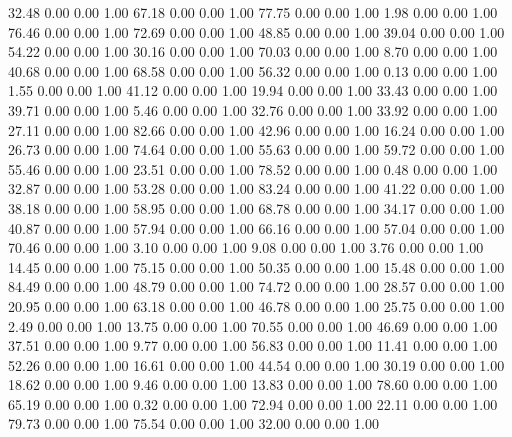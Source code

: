    32.48   0.00   0.00   1.00
   67.18   0.00   0.00   1.00
   77.75   0.00   0.00   1.00
    1.98   0.00   0.00   1.00
   76.46   0.00   0.00   1.00
   72.69   0.00   0.00   1.00
   48.85   0.00   0.00   1.00
   39.04   0.00   0.00   1.00
   54.22   0.00   0.00   1.00
   30.16   0.00   0.00   1.00
   70.03   0.00   0.00   1.00
    8.70   0.00   0.00   1.00
   40.68   0.00   0.00   1.00
   68.58   0.00   0.00   1.00
   56.32   0.00   0.00   1.00
    0.13   0.00   0.00   1.00
    1.55   0.00   0.00   1.00
   41.12   0.00   0.00   1.00
   19.94   0.00   0.00   1.00
   33.43   0.00   0.00   1.00
   39.71   0.00   0.00   1.00
    5.46   0.00   0.00   1.00
   32.76   0.00   0.00   1.00
   33.92   0.00   0.00   1.00
   27.11   0.00   0.00   1.00
   82.66   0.00   0.00   1.00
   42.96   0.00   0.00   1.00
   16.24   0.00   0.00   1.00
   26.73   0.00   0.00   1.00
   74.64   0.00   0.00   1.00
   55.63   0.00   0.00   1.00
   59.72   0.00   0.00   1.00
   55.46   0.00   0.00   1.00
   23.51   0.00   0.00   1.00
   78.52   0.00   0.00   1.00
    0.48   0.00   0.00   1.00
   32.87   0.00   0.00   1.00
   53.28   0.00   0.00   1.00
   83.24   0.00   0.00   1.00
   41.22   0.00   0.00   1.00
   38.18   0.00   0.00   1.00
   58.95   0.00   0.00   1.00
   68.78   0.00   0.00   1.00
   34.17   0.00   0.00   1.00
   40.87   0.00   0.00   1.00
   57.94   0.00   0.00   1.00
   66.16   0.00   0.00   1.00
   57.04   0.00   0.00   1.00
   70.46   0.00   0.00   1.00
    3.10   0.00   0.00   1.00
    9.08   0.00   0.00   1.00
    3.76   0.00   0.00   1.00
   14.45   0.00   0.00   1.00
   75.15   0.00   0.00   1.00
   50.35   0.00   0.00   1.00
   15.48   0.00   0.00   1.00
   84.49   0.00   0.00   1.00
   48.79   0.00   0.00   1.00
   74.72   0.00   0.00   1.00
   28.57   0.00   0.00   1.00
   20.95   0.00   0.00   1.00
   63.18   0.00   0.00   1.00
   46.78   0.00   0.00   1.00
   25.75   0.00   0.00   1.00
    2.49   0.00   0.00   1.00
   13.75   0.00   0.00   1.00
   70.55   0.00   0.00   1.00
   46.69   0.00   0.00   1.00
   37.51   0.00   0.00   1.00
    9.77   0.00   0.00   1.00
   56.83   0.00   0.00   1.00
   11.41   0.00   0.00   1.00
   52.26   0.00   0.00   1.00
   16.61   0.00   0.00   1.00
   44.54   0.00   0.00   1.00
   30.19   0.00   0.00   1.00
   18.62   0.00   0.00   1.00
    9.46   0.00   0.00   1.00
   13.83   0.00   0.00   1.00
   78.60   0.00   0.00   1.00
   65.19   0.00   0.00   1.00
    0.32   0.00   0.00   1.00
   72.94   0.00   0.00   1.00
   22.11   0.00   0.00   1.00
   79.73   0.00   0.00   1.00
   75.54   0.00   0.00   1.00
   32.00   0.00   0.00   1.00
